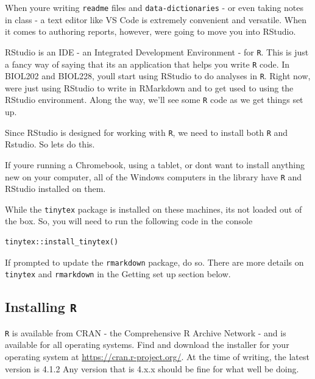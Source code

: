 \documentclass[
]{book}
\begin{document}
When you\textquotesingle re writing \texttt{readme} files and \texttt{data-dictionaries} - or even taking notes in class - a text editor like VS Code is extremely convenient and versatile. When it comes to authoring reports, however, we\textquotesingle re going to move you into RStudio.

RStudio is an IDE - an Integrated Development Environment - for \texttt{R}. This is just a fancy way of saying that it\textquotesingle s an application that helps you write \texttt{R} code. In BIOL202 and BIOL228, you\textquotesingle ll start using RStudio to do analyses in \texttt{R}. Right now, we\textquotesingle re just using RStudio to write in RMarkdown and to get used to using the RStudio environment. Along the way, we'll see some \texttt{R} code as we get things set up.

Since RStudio is designed for working with \texttt{R}, we need to install both \texttt{R} and Rstudio. So let\textquotesingle s do this.

If you\textquotesingle re running a Chromebook, using a tablet, or don\textquotesingle t want to install anything new on your computer, all of the Windows computers in the library have \texttt{R} and RStudio installed on them.

While the \texttt{tinytex} package is installed on these machines, it\textquotesingle s not loaded out of the box. So, you will need to run the following code in the console

\begin{verbatim}
tinytex::install_tinytex()
\end{verbatim}

If prompted to update the \texttt{rmarkdown} package, do so. There are more details on \texttt{tinytex} and \texttt{rmarkdown} in the \textquotesingle Getting set up\textquotesingle{} section below.

\hypertarget{installing-r}{%
\subsection*{\texorpdfstring{Installing \texttt{R}}{Installing R}}\label{installing-r}}

\texttt{R} is available from CRAN - the Comprehensive R Archive Network - and is available for all operating systems. Find and download the installer for your operating system at \url{https://cran.r-project.org/}. At the time of writing, the latest version is 4.1.2 Any version that is 4.x.x should be fine for what we\textquotesingle ll be doing.
\end{document}
